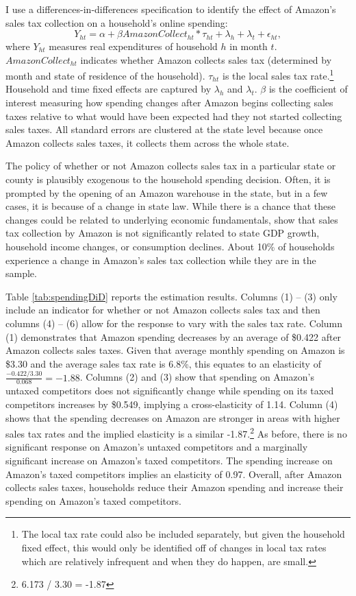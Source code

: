 \documentclass[AEJ,reviewmode]{AEA}
\begin{document}
I use a differences-in-differences specification to identify the effect of Amazon's sales tax collection on a household's online spending:
\begin{equation}
\label{eq:model}
Y_{ht} = \alpha + \beta AmazonCollect_{ht} * \tau_{ht} + \lambda_h + \lambda_t + \epsilon_{ht},
\end{equation}
where $Y_{ht}$ measures real expenditures of household $h$ in month $t$. $AmazonCollect_{ht}$ indicates whether Amazon collects sales tax (determined by month and state of residence of the household). $\tau_{ht}$ is the local sales tax rate.\footnote{The local tax rate could also be included separately, but given the household fixed effect, this would only be identified off of changes in local tax rates which are relatively infrequent and when they do happen, are small.} Household and time fixed effects are captured by $\lambda_h$ and $\lambda_t$. $\beta$ is the coefficient of interest measuring how spending changes after Amazon begins collecting sales taxes relative to what would have been expected had they not started collecting sales taxes. All standard errors are clustered at the state level because once Amazon collects sales taxes, it collects them across the whole state.

The policy of whether or not Amazon collects sales tax in a particular state or county is plausibly exogenous to the household spending decision. Often, it is prompted by the opening of an Amazon warehouse in the state, but in a few cases, it is because of a change in state law. While there is a chance that these changes could be related to underlying economic fundamentals, \citet{baughBenDavidPark2016} show that sales tax collection by Amazon is not significantly related to state GDP growth, household income changes, or consumption declines. About 10\% of households experience a change in Amazon's sales tax collection while they are in the sample.



Table \ref{tab:spendingDiD} reports the estimation results. Columns (1) -- (3) only include an indicator for whether or not Amazon collects sales tax and then columns (4) -- (6) allow for the response to vary with the sales tax rate. Column (1) demonstrates that Amazon spending decreases by an average of \$0.422 after Amazon collects sales taxes. Given that average monthly spending on Amazon is \$3.30 and the average sales tax rate is 6.8\%, this equates to an elasticity of $\frac{-0.422 / 3.30}{0.068} = -1.88$. Columns (2) and (3) show that spending on Amazon's untaxed competitors does not significantly change while spending on its taxed competitors increases by \$0.549, implying a cross-elasticity of 1.14. Column (4) shows that the spending decreases on Amazon are stronger in areas with higher sales tax rates and the implied elasticity is a similar -1.87.\footnote{6.173 / 3.30 = -1.87} As before, there is no significant response on Amazon's untaxed competitors and a marginally significant increase on Amazon's taxed competitors. The spending increase on Amazon's taxed competitors implies an elasticity of 0.97. Overall, after Amazon collects sales taxes, households reduce their Amazon spending and increase their spending on Amazon's taxed competitors.
\end{document}
